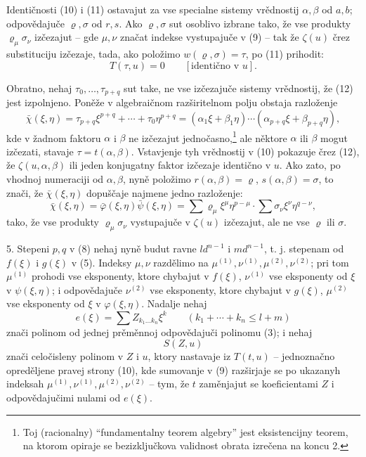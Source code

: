 \documentclass[11pt]{article}
\begin{document}
Identičnosti (10) i (11) ostavajut za vse specialne sistemy vrědnostij $\alpha,\beta$ od $a,b$; odpovědajuče $\varrho,\sigma$ od $r,s$. Ako $\varrho,\sigma$ sut osoblivo izbrane tako, že vse produkty $\varrho_\mu\sigma_\nu$ izčezajut -- gde $\mu,\nu$ značat indekse vystupajuče v (9) -- tak že $\zeta(u)$ črez substituciju izčezaje, tada, ako položimo $w(\varrho,\sigma)=\tau$, po (11) prihodit:
\begin{equation}
 T(\tau,u)=0\qquad[\text{identično v }u].
\tag{12}
\end{equation}

Obratno, nehaj $\tau_0,\ldots,\tau_{p+q}$ sut take, ne vse izčezajuče sistemy vrědnostij, že (12) jest izpolnjeno. Poněže v algebraičnom razširitelnom polju obstaja razloženje
\begin{equation}
 \bar\chi(\xi,\eta)=\tau_{p+q}\xi^{p+q}+\cdots+\tau_0\eta^{p+q}
=(\alpha_1\xi+\beta_1\eta)\cdots(\alpha_{p+q}\xi+\beta_{p+q}\eta),
\tag{12'}
\end{equation}
kde v žadnom faktoru $\alpha$ i $\beta$ ne izčezajut jednočasno,\footnote{Toj (racionalny) ``fundamentalny teorem algebry'' jest eksistencijny teorem, na ktorom opiraje se bezizključkova validnost obrata izrečena na koncu 2.} ale něktore $\alpha$ ili $\beta$ mogut izčezati, stavaje $\tau=t(\alpha,\beta)$. Vstavjenje tyh vrědnostij v (10) pokazuje črez (12), že $\zeta(u,\alpha,\beta)$ ili jeden konjugatny faktor izčezaje identično v $u$. Ako zato, po vhodnoj numeraciji od $\alpha,\beta$, nyně položimo $r(\alpha,\beta)=\varrho$, $s(\alpha,\beta)=\sigma$, to znači, že $\bar\chi(\xi,\eta)$ dopuščaje najmene jedno razloženje:
\begin{equation}
\bar\chi(\xi,\eta)=\bar\varphi(\xi,\eta)\bar\psi(\xi,\eta)
=\sum \varrho_\mu\xi^\mu\eta^{p-\mu}\cdot\sum \sigma_\nu\xi^\nu\eta^{q-\nu},
\tag{13}
\end{equation}
tako, že vse produkty $\varrho_\mu\sigma_\nu$ vystupajuče v $\zeta(u)$ izčezajut, ale ne vse $\varrho$ ili $\sigma$.

5. Stepeni $p,q$ v (8) nehaj nyně budut ravne $ld^{n-1}$ i $md^{n-1}$, t. j. stepenam od $f(\xi)$ i $g(\xi)$ v (5). Indeksy $\mu,\nu$ razdělimo na $\mu^{(1)},\nu^{(1)},\mu^{(2)},\nu^{(2)}$; pri tom $\mu^{(1)}$ prohodi vse eksponenty, ktore chybajut v $f(\xi)$, $\nu^{(1)}$ vse eksponenty od $\xi$ v $\psi(\xi,\eta)$; i odpovědajuče $\nu^{(2)}$ vse eksponenty, ktore chybajut v $g(\xi)$, $\mu^{(2)}$ vse eksponenty od $\xi$ v $\varphi(\xi,\eta)$. Nadalje nehaj
\[
 e(\xi)=\sum Z_{k_1\ldots k_n}\xi^k\qquad(k_1+\cdots+k_n\le l+m)
\]
znači polinom od jednej prěměnnoj odpovědajuči polinomu (3); i nehaj
\[
 S(Z,u)
\]
znači celočisleny polinom v $Z$ i $u$, ktory nastavaje iz $T(t,u)$ -- jednoznačno opreděljene pravej strony (10), kde sumovanje v (9) razširjaje se po ukazanyh indeksah $\mu^{(1)},\nu^{(1)},\mu^{(2)},\nu^{(2)}$ -- tym, že $t$ zaměnjajut se koeficientami $Z$ i odpovědajučimi nulami od $e(\xi)$.
\end{document}
